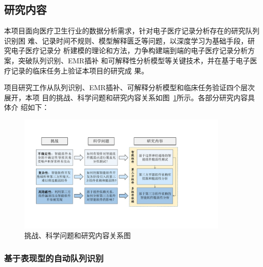 \subsection{研究内容}\label{ch2content}

本项目面向医疗卫生行业的数据分析需求，针对电子医疗记录分析存在的研究队列识别困
难、记录时间不规则、模型解释匮乏等问题，以深度学习为基础手段，研究电子医疗记录分
析建模的理论和方法，力争构建端到端的电子医疗记录分析方案，突破队列识别、EMR插补
和可解释性分析模型等关键技术，并在基于电子医疗记录的临床任务上验证本项目的研究成
果。

项目研究工作从队列识别、EMR插补、可解释分析模型和临床任务验证四个层次展开，本项
目的挑战、科学问题和研究内容关系如图~\ref{fig:ch2:rc}所示。各部分研究内容具体介
绍如下：

\begin{figure}
    \begin{small}
        \begin{center}
            \includegraphics[width=0.9\textwidth]{overview.pdf}
        \end{center}
        \caption{挑战、科学问题和研究内容关系图}
        \label{fig:ch2:rc}
    \end{small}
\end{figure}

\subsubsection{基于表现型的自动队列识别}

